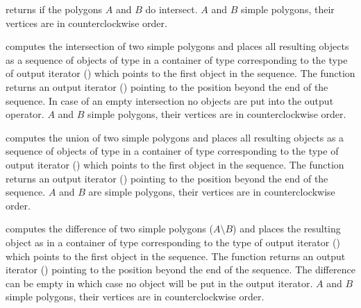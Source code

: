 

{ returns  if the polygons $A$ and $B$ do intersect.
\ccPrecond $A$ and $B$ simple polygons, their vertices are in
counterclockwise order.}

{computes the intersection of two simple polygons and places all
resulting objects as a sequence of objects of type 
in a container of type corresponding to the type of
 output iterator ()
 which points to the first object in the
sequence.  
The function returns an output iterator () 
pointing to the position beyond the end of the sequence.
In case of an 
empty intersection no objects are put into the output operator.
 \ccPrecond $A$ and $B$ simple polygons, their vertices are in
counterclockwise order.
}


{computes the union of two simple polygons and places all
resulting objects as a sequence of objects of type 
in a container of type corresponding to the type of
 output iterator ()
 which points to the first object in the
sequence.
The function returns an output iterator () 
pointing to the position beyond the end of the sequence.
 \ccPrecond $A$ and $B$ are simple polygons, their vertices are in
counterclockwise order.
}

{computes the difference of two simple polygons ($A \setminus B$) and 
places the
resulting object as 
in a container of type corresponding to the type of
 output iterator ()
 which points to the first object in the
sequence.
The function returns an output iterator () 
pointing to the position beyond the end of the sequence.
The difference can be empty in which case no object will be put
in the output iterator.
 \ccPrecond $A$ and $B$ simple polygons, their vertices are in
counterclockwise order.
}

